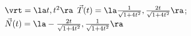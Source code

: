 {$\vrt = \la t, t^2 \ra$
}
{$\vec T(t) = \la \frac{1}{\sqrt{1+4t^2}},\frac{2t}{\sqrt{1+4t^2}}\ra$; $\vec N(t) = \la -\frac{2t}{\sqrt{1+4t^2}},\frac{1}{\sqrt{1+4t^2}}\ra$
}